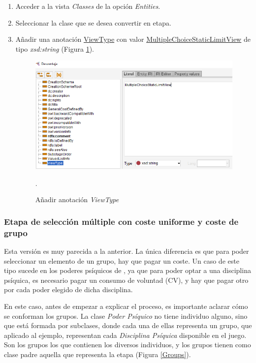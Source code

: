 \begin{enumerate}
    \item Acceder a la vista \textit{Classes} de la opción \textit{Entities}.
    \item Seleccionar la clase que se desea convertir en etapa.
    \item Añadir una anotación \underline{ViewType} con valor \underline{MultipleChoiceStaticLimitView} de tipo \textit{xsd:string}
    (Figura \ref*{MultipleChoice_1}).
    \begin{figure}[H]
        \centering
        \includegraphics[scale=0.6]{Figures/Protege/MultipleChoice_1.png}
        \caption{Añadir anotación \textit{ViewType}}.
        \label{MultipleChoice_1}
    \end{figure}
\end{enumerate}

\subsubsection{Etapa de selección múltiple con coste uniforme y coste de grupo}\label{MultipleChoiceUniformCostGroup}
Esta versión es muy parecida a la anterior. La única diferencia es que para poder seleccionar un elemento de un grupo, hay que pagar 
un coste. Un caso de este tipo sucede en los poderes psíquicos de \anima, ya que para poder optar a una disciplina psíquica, es 
necesario pagar un consumo de voluntad (CV), y hay que pagar otro por cada poder elegido de dicha disciplina.\newpage

En este caso, antes de empezar a explicar el proceso, es importante aclarar cómo se conforman los grupos. La clase \textit{Poder Psíquico}
no tiene individuo alguno, sino que está formada por subclases, donde cada una de ellas representa un grupo, que aplicado al ejemplo, 
representan cada \textit{Disciplina Psíquica} disponible en el juego. Son los grupos los que contienen los diversos individuos, 
y los grupos tienen como clase padre aquella que representa la etapa (Figura \ref*{Groups}).

